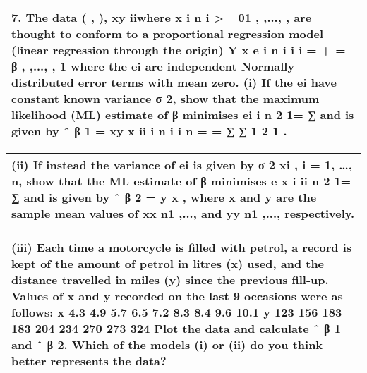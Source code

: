 \documentclass[a4paper,12pt]{article}
\begin{document}
\begin{table}[ht!]
     \centering
     \begin{tabular}{|p{15cm}|}
     \hline        
7. The data ( , ), xy iiwhere x i n i >= 01 , ,..., , are thought to conform to a proportional regression model (linear regression through the origin)
Y x e i n i i i = + = β , ,..., , 1
where the ei are independent Normally distributed error terms with mean zero.
(i) If the ei have constant known variance 
σ 2, show that the maximum likelihood (ML)
estimate of 
β
 minimises ei i n 2 1= ∑ and is given by
ˆ β 1 =
xy
x
ii
i
n
i
i
n =
=
∑
∑
1
2
1
.

\\ \hline
      \end{tabular}
    \end{table}
    
  \begin{table}[ht!]
     \centering
     \begin{tabular}{|p{15cm}|}
     \hline  
(ii) If instead the variance of ei is given by 
σ
2
xi ,  i = 1, …, n,  show that the
ML estimate of 
β
 minimises 
e x i ii n 2 1= ∑ and is given by
ˆ β 2 =   
y x
,
where x and y are the sample mean values of xx n1 ,..., and yy n1 ,..., respectively. \\ \hline 
      \end{tabular}
    \end{table}
  \begin{table}[ht!]
     \centering
     \begin{tabular}{|p{15cm}|}
     \hline  
(iii) Each time a motorcycle is filled with petrol, a record is kept of the amount of petrol in litres (x) used, and the distance travelled in miles (y) since the previous fill-up. Values of x and y recorded on the last 9 occasions were as follows:
x 4.3 4.9 5.7 6.5 7.2 8.3 8.4 9.6 10.1
y 123 156 183 183 204 234 270 273 324
Plot the data and calculate ˆ β 1 and ˆ β 2.  Which of the models (i) or (ii) do you think better represents the data? 
\\ \hline
      \end{tabular}
    \end{table}
\end{document}
